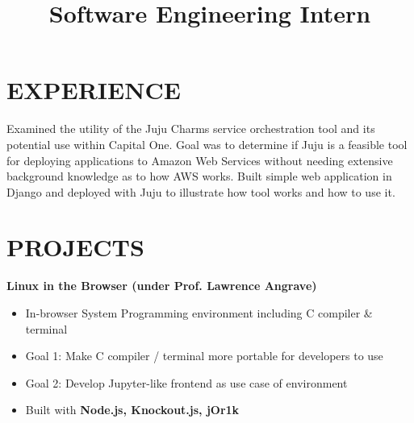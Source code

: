 \documentclass[margin]{res}
\begin{document}
\begin{resume}
\section{EXPERIENCE}
\title{\textbf{Software Engineering Intern}}
\begin{position}
Examined the utility of the Juju Charms service orchestration tool and its potential
use within Capital One. Goal was to determine if Juju is a feasible tool for deploying
applications to Amazon Web Services without needing extensive background knowledge as
to how AWS works. Built simple web application in Django and deployed with Juju to
illustrate how tool works and how to use it.
\end{position}



\section{PROJECTS}

\textbf{Linux in the Browser (under Prof. Lawrence Angrave)}
\begin{itemize}
  \item In-browser System Programming environment including C compiler \& terminal
  \item Goal 1: Make C compiler / terminal more portable for developers to use
  \item Goal 2: Develop Jupyter-like frontend as use case of environment
  \item Built with \textbf{Node.js, Knockout.js, jOr1k}
\end{itemize}


\end{resume}
\end{document}

